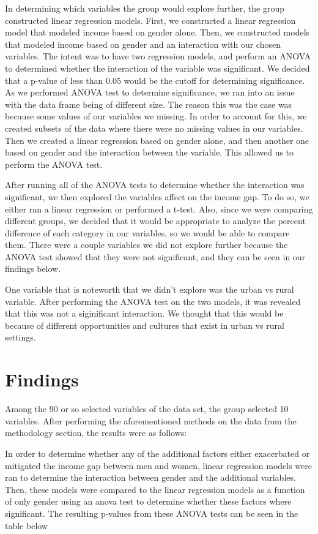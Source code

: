 \documentclass[
]{article}
\begin{document}
In determining which variables the group would explore further, the
group constructed linear regression models. First, we constructed a
linear regression model that modeled income based on gender alone. Then,
we constructed models that modeled income based on gender and an
interaction with our chosen variables. The intent was to have two
regression models, and perform an ANOVA to determined whether the
interaction of the variable was significant. We decided that a p-value
of less than 0.05 would be the cutoff for determining significance. As
we performed ANOVA test to determine significance, we ran into an issue
with the data frame being of different size. The reason this was the
case was because some values of our variables we missing. In order to
account for this, we created subsets of the data where there were no
missing values in our variables. Then we created a linear regression
based on gender alone, and then another one based on gender and the
interaction between the variable. This allowed us to perform the ANOVA
test.

After running all of the ANOVA tests to determine whether the
interaction was significant, we then explored the variables affect on
the income gap. To do so, we either ran a linear regression or performed
a t-test. Also, since we were comparing different groups, we decided
that it would be appropriate to analyze the percent difference of each
category in our variables, so we would be able to compare them. There
were a couple variables we did not explore further because the ANOVA
test showed that they were not significant, and they can be seen in our
findings below.

One variable that is noteworth that we didn't explore was the urban vs
rural variable. After performing the ANOVA test on the two models, it
was revealed that this was not a siginificant interaction. We thought
that this would be because of different opportunities and cultures that
exist in urban vs rural settings.

\hypertarget{findings}{%
\section{Findings}\label{findings}}

Among the 90 or so selected variables of the data set, the group
selected 10 variables. After performing the aforementioned methods on
the data from the methodology section, the results were as follows:

In order to determine whether any of the additional factors either
exacerbated or mitigated the income gap between men and women, linear
regression models were ran to determine the interaction between gender
and the additional variables. Then, these models were compared to the
linear regression models as a function of only gender using an anova
test to determine whether these factors where significant. The resulting
p-values from these ANOVA tests can be seen in the table below
\end{document}
